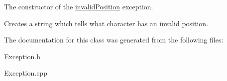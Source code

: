 The constructor of the \hyperlink{classinvalid_position}{invalid\-Position} exception. 

Creates a string which tells what character has an invalid position. 

The documentation for this class was generated from the following files\-:\begin{DoxyCompactItemize}
\item 
Exception.\-h\item 
Exception.\-cpp\end{DoxyCompactItemize}
